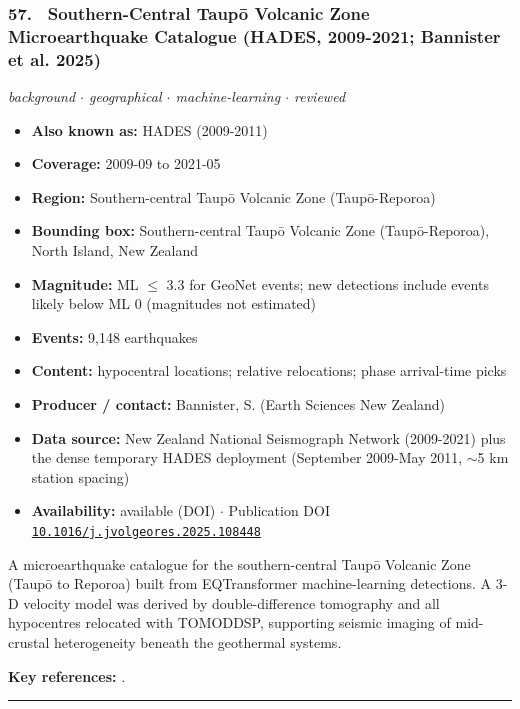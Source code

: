 \documentclass[10pt,a4paper]{article}
\newcommand{\catentryrule}{\par\vspace{3pt}\noindent\textcolor{rulegrey}{\rule{\linewidth}{0.3pt}}\par\vspace{5pt}}
\newcommand{\kv}[2]{\item \textbf{#1:} #2}
\begin{document}
\subsubsection*{\hypertarget{c:57}{57.}~ Southern-Central Taupō Volcanic Zone Microearthquake Catalogue (HADES, 2009-2021; Bannister et al. 2025)}
{\small\itshape background $\cdot$ geographical $\cdot$ machine-learning $\cdot$ reviewed}\par\vspace{2pt}
\begin{itemize}[leftmargin=1.3em,itemsep=0.6pt,topsep=1pt,parsep=0pt]
\kv{Also known as}{HADES (2009-2011)}
\kv{Coverage}{2009-09 to 2021-05}
\kv{Region}{Southern-central Taupō Volcanic Zone (Taupō-Reporoa)}
\kv{Bounding box}{Southern-central Taupō Volcanic Zone (Taupō-Reporoa), North Island, New Zealand}
\kv{Magnitude}{ML $\leq$ 3.3 for GeoNet events; new detections include events likely below ML 0 (magnitudes not estimated)}
\kv{Events}{9,148 earthquakes}
\kv{Content}{hypocentral locations; relative relocations; phase arrival-time picks}
\kv{Producer / contact}{Bannister, S. (Earth Sciences New Zealand)}
\kv{Data source}{New Zealand National Seismograph Network (2009-2021) plus the dense temporary HADES deployment (September 2009-May 2011, $\sim$5 km station spacing)}
\kv{Availability}{available (DOI) $\cdot$ Publication DOI \href{https://doi.org/10.1016/j.jvolgeores.2025.108448}{\nolinkurl{10.1016/j.jvolgeores.2025.108448}}}
\end{itemize}
\par\vspace{2pt}A microearthquake catalogue for the southern-central Taupō Volcanic Zone (Taupō to Reporoa) built from EQTransformer machine-learning detections. A 3-D velocity model was derived by double-difference tomography and all hypocentres relocated with TOMODDSP, supporting seismic imaging of mid-crustal heterogeneity beneath the geothermal systems.
\par\vspace{2pt}\textbf{Key references:} \cite{Bannister2025}.
\catentryrule
\end{document}
